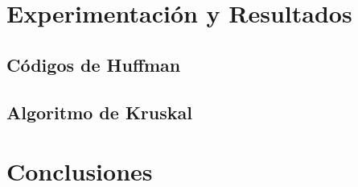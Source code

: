 \documentclass{report}
\begin{document}
\chapter*{Experimentación y Resultados}
        \section*{Códigos de Huffman}
        
        \newpage
    
    \section*{Algoritmo de Kruskal}
        
        \newpage
        
\chapter*{Conclusiones}
    
\end{document}
